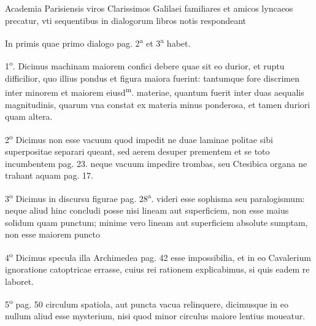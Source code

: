 \documentclass[11pt,a4paper]{article}
\begin{document}


Academia Parisiensis viros Clarissimos Galilaei familiares et amicos lyncaeos precatur, vti sequentibus in dialogorum libros notis respondeant

In primis quae primo dialogo pag. 2\textsuperscript{a} et 3\textsuperscript{a} habet.

1\textsuperscript{o}. Dicimus machinam maiorem confici debere quae sit eo durior, et ruptu difficilior, quo illius pondus et figura maiora fuerint: tantumque fore discrimen inter minorem et maiorem eiusd\textsuperscript{m}. materiae, quantum fuerit inter duas aequalis magnitudinis, quarum vna constat ex materia minus ponderosa, et tamen duriori quam altera.

2\textsuperscript{o} Dicimus non esse vacuum quod impedit ne duae laminae politae sibi superpositae separari queant, sed aerem desuper prementem et se toto incumbentem pag. 23. neque vacuum impedire trombas, seu Ctesibica organa ne trahant aquam pag. 17.

3\textsuperscript{o} Dicimus in discursu figurae pag. 28\textsuperscript{a}. videri esse sophisma seu paralogismum: neque aliud hinc concludi posse nisi lineam aut superficiem, non esse maius solidum quam punctum; minime vero lineam aut superficiem absolute sumptam, non esse maiorem puncto

4\textsuperscript{o} Dicimus specula illa Archimedea pag. 42 esse impossibilia, et in eo Cavalerium ignoratione  catoptricae errasse, cuius rei rationem explicabimus, si quis eadem re laboret.

5\textsuperscript{o}  pag. 50 circulum spatiola, aut puncta vacua relinquere, dicimusque in eo nullum aliud esse mysterium, nisi quod minor circulus maiore lentius moueatur.
\end{document}
